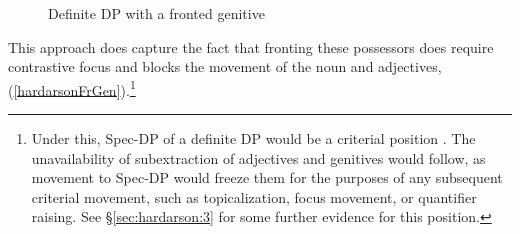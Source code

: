 \documentclass[output=paper]{langscibook}
\begin{document}
\begin{figure}
\caption{Definite DP with a fronted genitive\label{hardarsonfrontposs}}
\end{figure}

This approach does capture the fact that fronting these possessors does require contrastive focus and blocks the movement of the noun and adjectives, (\ref{hardarsonFrGen}).\footnote{Under this, Spec-DP of a definite DP would be a criterial position \citep[cf.][]{Rizzi:2006ti,Boskovic:2008wp,wurmbrand2014gisli,wurmbrand2015}. The unavailability of subextraction of adjectives and genitives would follow, as movement to Spec-DP would freeze them for the purposes of any subsequent criterial movement, such as topicalization, focus movement, or quantifier raising. See \S\ref{sec:hardarson:3} for some further evidence for this position.}

\begin{exe}
\ex	\label{hardarsonFrGen}
	\begin{xlist}
	\setlength{\columnsep}{20pt}
	\begin{multicols}{2}
	\end{multicols}
	\end{xlist}
\end{exe}
\end{document}
